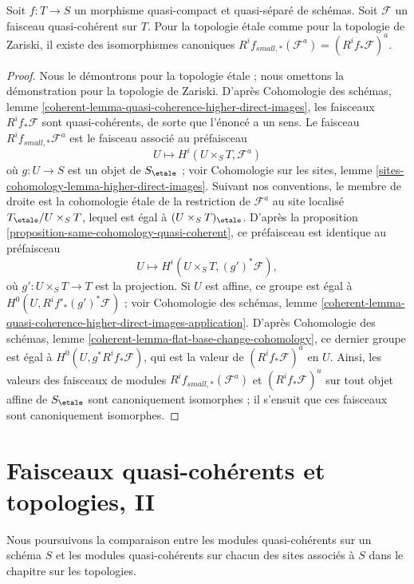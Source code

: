 \begin{lemma}
\label{lemma-higher-direct-images-small-etale}
Soit $f : T \to S$ un morphisme quasi-compact et quasi-séparé de schémas.
Soit $\mathcal{F}$ un faisceau quasi-cohérent sur $T$. Pour la topologie
\'etale comme pour la topologie de Zariski, il existe des isomorphismes canoniques
$R^if_{small, *}(\mathcal{F}^a) = (R^if_*\mathcal{F})^a$.
\end{lemma}

\begin{proof}
Nous le démontrons pour la topologie \'etale ; nous omettons la démonstration
pour la topologie de Zariski. D'après Cohomologie des schémas, lemme
\ref{coherent-lemma-quasi-coherence-higher-direct-images},
les faisceaux $R^if_*\mathcal{F}$ sont quasi-cohérents, de sorte que l'énoncé
a un sens. Le faisceau $R^if_{small, *}\mathcal{F}^a$ est le faisceau associé
au préfaisceau
$$
U \longmapsto H^i(U \times_S T, \mathcal{F}^a)
$$
où $g : U \to S$ est un objet de $S_\etale$ ; voir Cohomologie sur les sites,
lemme \ref{sites-cohomology-lemma-higher-direct-images}.
Suivant nos conventions, le membre de droite est la cohomologie \'etale
de la restriction de $\mathcal{F}^a$ au site localisé
$T_\etale/U \times_S T$, lequel est égal à
$(U \times_S T)_\etale$. D'après la
proposition \ref{proposition-same-cohomology-quasi-coherent},
ce préfaisceau est identique au préfaisceau
$$
U \longmapsto
H^i(U \times_S T, (g')^*\mathcal{F}),
$$
où $g' : U \times_S T \to T$ est la projection. Si $U$ est affine,
ce groupe est égal à $H^0(U, R^if'_*(g')^*\mathcal{F})$ ; voir
Cohomologie des schémas, lemme
\ref{coherent-lemma-quasi-coherence-higher-direct-images-application}.
D'après Cohomologie des schémas, lemme
\ref{coherent-lemma-flat-base-change-cohomology},
ce dernier groupe est égal à $H^0(U, g^*R^if_*\mathcal{F})$, qui est la valeur
de $(R^if_*\mathcal{F})^a$ en $U$.
Ainsi, les valeurs des faisceaux de modules
$R^if_{small, *}(\mathcal{F}^a)$ et $(R^if_*\mathcal{F})^a$
sur tout objet affine de $S_\etale$ sont canoniquement isomorphes ;
il s'ensuit que ces faisceaux sont canoniquement isomorphes.
\end{proof}




\section{Faisceaux quasi-cohérents et topologies, II}
\label{section-quasi-coherent-sheaves-bis}

\noindent
Nous poursuivons la comparaison entre les modules quasi-cohérents sur un
schéma $S$ et les modules quasi-cohérents sur chacun des sites associés à
$S$ dans le chapitre sur les topologies.



